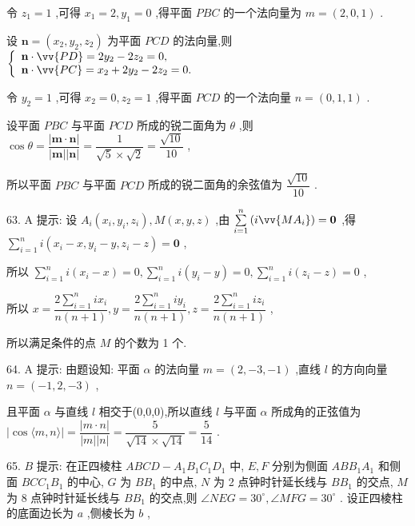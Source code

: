 令 ${z}_{1} = 1$ ,可得 ${x}_{1} = 2,{y}_{1} = 0$ ,得平面 ${PBC}$ 的一个法向量为 $m = \left( {2,0,1}\right)$ .

设 $\mathbf{n} = \left( {{x}_{2},{y}_{2},{z}_{2}}\right)$ 为平面 ${PCD}$ 的法向量,则 $\left\{  \begin{array}{l} \mathbf{n} \cdot  \vv{PD} = 2{y}_{2} - 2{z}_{2} = 0, \\  \mathbf{n} \cdot  \vv{PC} = {x}_{2} + 2{y}_{2} - 2{z}_{2} = 0. \end{array}\right.$

令 ${y}_{2} = 1$ ,可得 ${x}_{2} = 0,{z}_{2} = 1$ ,得平面 ${PCD}$ 的一个法向量 $n = \left( {0,1,1}\right)$ .

设平面 ${PBC}$ 与平面 ${PCD}$ 所成的锐二面角为 $\theta$ ,则 $\cos \theta  = \dfrac{\left| \mathbf{m} \cdot  \mathbf{n}\right| }{\left| \mathbf{m}\right| \left| \mathbf{n}\right| } = \dfrac{1}{\sqrt{5} \times  \sqrt{2}} = \dfrac{\sqrt{10}}{10}$ ,

所以平面 ${PBC}$ 与平面 ${PCD}$ 所成的锐二面角的余弦值为 $\dfrac{\sqrt{10}}{10}$ .

63. A 提示: 设 ${A}_{i}\left( {{x}_{i},{y}_{i},{z}_{i}}\right) ,M\left( {x,y,z}\right)$ ,由 $\mathop{\sum }\limits_{{i = 1}}^{n}\left( {i\vv{M{A}_{i}}}\right)  = \mathbf{0}$ ,得 $\mathop{\sum }\limits_{{i = 1}}^{n}i\left( {{x}_{i} - x,{y}_{i} - y,{z}_{i} - z}\right)  = \mathbf{0}$ ,

所以 $\mathop{\sum }\limits_{{i = 1}}^{n}i\left( {{x}_{i} - x}\right)  = 0,\mathop{\sum }\limits_{{i = 1}}^{n}i\left( {{y}_{i} - y}\right)  = 0,\mathop{\sum }\limits_{{i = 1}}^{n}i\left( {{z}_{i} - z}\right)  = 0$ ,

所以 $x = \dfrac{2\mathop{\sum }\limits_{{i = 1}}^{n}i{x}_{i}}{n\left( {n + 1}\right) },y = \dfrac{2\mathop{\sum }\limits_{{i = 1}}^{n}i{y}_{i}}{n\left( {n + 1}\right) },z = \dfrac{2\mathop{\sum }\limits_{{i = 1}}^{n}i{z}_{i}}{n\left( {n + 1}\right) }$ ,

所以满足条件的点 $M$ 的个数为 1 个.

64. A 提示: 由题设知: 平面 $\alpha$ 的法向量 $m = \left( {2, - 3, - 1}\right)$ ,直线 $l$ 的方向向量 $n = \left( {-1,2, - 3}\right)$ ,

且平面 $\alpha$ 与直线 $l$ 相交于(0,0,0),所以直线 $l$ 与平面 $\alpha$ 所成角的正弦值为 $\left| {\cos \langle m,n\rangle }\right|  = \dfrac{\left| m \cdot  n\right| }{\left| m\right| \left| n\right| } = \dfrac{5}{\sqrt{14} \times  \sqrt{14}} = \dfrac{5}{14}$ .

65. $B$ 提示: 在正四棱柱 ${ABCD} - {A}_{1}{B}_{1}{C}_{1}{D}_{1}$ 中, $E,F$ 分别为侧面 ${AB}{B}_{1}{A}_{1}$ 和侧面 ${BC}{C}_{1}{B}_{1}$ 的中心, $G$ 为 $B{B}_{1}$ 的中点, $N$ 为 2 点钟时针延长线与 $B{B}_{1}$ 的交点, $M$ 为 8 点钟时针延长线与 $B{B}_{1}$ 的交点,则 $\angle {NEG} = {30}^{ \circ  },\angle {MFG} = {30}^{ \circ  }$ . 设正四棱柱的底面边长为 $a$ ,侧棱长为 $b$ ,

